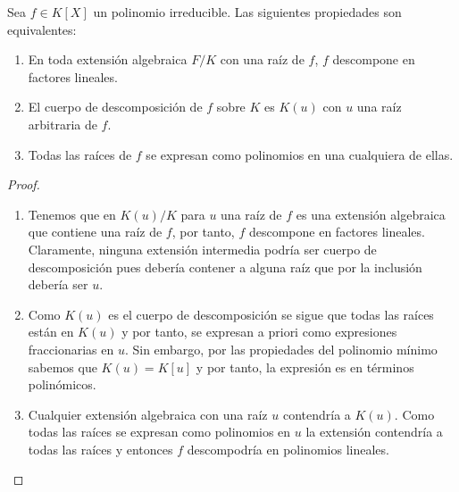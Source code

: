 \begin{proposition}
Sea $f \in K[X]$ un polinomio irreducible. Las siguientes propiedades son equivalentes:

\begin{enumerate}
\item En toda extensión algebraica $F/K$ con una raíz de $f$, $f$ descompone en factores lineales. 
\item El cuerpo de descomposición de $f$ sobre $K$ es $K(u)$ con $u$ una raíz arbitraria de $f$. 
\item Todas las raíces de $f$ se expresan como polinomios en una cualquiera de ellas. 
\end{enumerate}
\end{proposition}
\begin{proof}
\begin{enumerate}
\item Tenemos que en $K(u)/K$ para $u$ una raíz de $f$ es una extensión algebraica que contiene una raíz de $f$, por tanto, $f$ descompone en factores lineales. Claramente, ninguna extensión intermedia podría ser cuerpo de descomposición pues debería contener a alguna raíz que por la inclusión debería ser $u$. 
\item Como $K(u)$ es el cuerpo de descomposición se sigue que todas las raíces están en $K(u)$ y por tanto, se expresan a priori como expresiones fraccionarias en $u$. Sin embargo, por las propiedades del polinomio mínimo sabemos que $K(u) = K[u]$ y por tanto, la expresión es en términos polinómicos. 
\item Cualquier extensión algebraica con una raíz $u$ contendría a $K(u)$. Como todas las raíces se expresan como polinomios en $u$ la extensión contendría a todas las raíces y entonces $f$ descompodría en polinomios lineales. 
\end{enumerate}
\end{proof}

